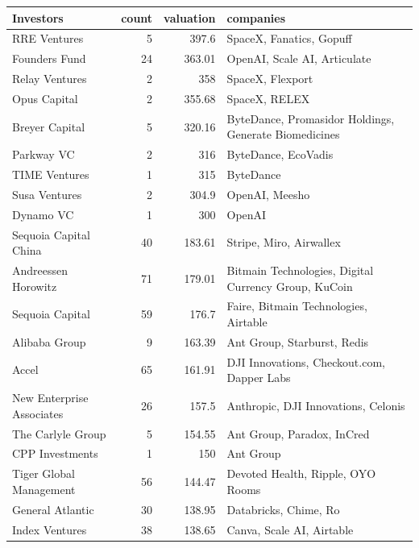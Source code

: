 \documentclass[a4paper,12pt]{article}
\begin{document}
\begin{table}[htbp]
\label{}
\centering
\begin{tabular}{lrrl}
Investors & count & valuation & companies\\
\hline
RRE Ventures & 5 & 397.6 & SpaceX, Fanatics, Gopuff\\
Founders Fund & 24 & 363.01 & OpenAI, Scale AI, Articulate\\
Relay Ventures & 2 & 358 & SpaceX, Flexport\\
Opus Capital & 2 & 355.68 & SpaceX, RELEX\\
Breyer Capital & 5 & 320.16 & ByteDance, Promasidor Holdings, Generate Biomedicines\\
Parkway VC & 2 & 316 & ByteDance, EcoVadis\\
TIME Ventures & 1 & 315 & ByteDance\\
Susa Ventures & 2 & 304.9 & OpenAI, Meesho\\
Dynamo VC & 1 & 300 & OpenAI\\
Sequoia Capital China & 40 & 183.61 & Stripe, Miro, Airwallex\\
Andreessen Horowitz & 71 & 179.01 & Bitmain Technologies, Digital Currency Group, KuCoin\\
Sequoia Capital & 59 & 176.7 & Faire, Bitmain Technologies, Airtable\\
Alibaba Group & 9 & 163.39 & Ant Group, Starburst, Redis\\
Accel & 65 & 161.91 & DJI Innovations, Checkout.com, Dapper Labs\\
New Enterprise Associates & 26 & 157.5 & Anthropic, DJI Innovations, Celonis\\
The Carlyle Group & 5 & 154.55 & Ant Group, Paradox, InCred\\
CPP Investments & 1 & 150 & Ant Group\\
Tiger Global Management & 56 & 144.47 & Devoted Health, Ripple, OYO Rooms\\
General Atlantic & 30 & 138.95 & Databricks, Chime, Ro\\
Index Ventures & 38 & 138.65 & Canva, Scale AI, Airtable\\
\end{tabular}
\end{table}
\newpage
\end{document}
